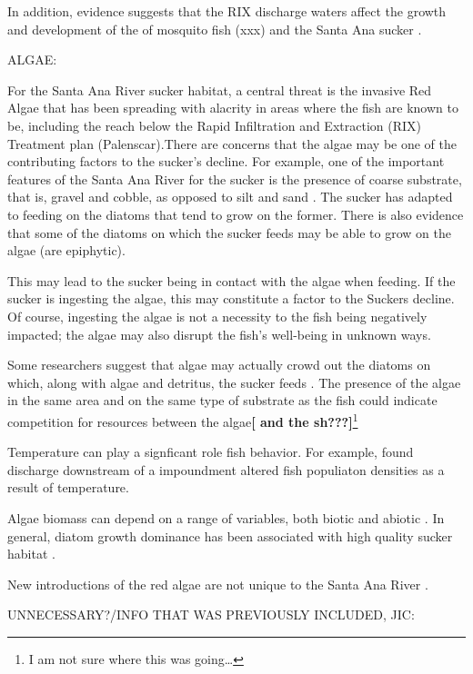 \documentclass{article}\usepackage[]{graphicx}\usepackage[]{color}
\begin{document}
In addition, evidence suggests that the RIX discharge waters affect the growth and development of the of mosquito fish (xxx) and the Santa Ana sucker \citep{jenkins2009effects}.

ALGAE: 

For the Santa Ana River sucker habitat, a central threat is the invasive Red Algae that has been spreading with alacrity in areas where the fish are known to be, including the reach below the Rapid Infiltration and Extraction (RIX) Treatment plan (Palenscar).There are concerns that the algae may be one of the contributing factors to the sucker's decline. For example, one of the important features of the Santa Ana River for the sucker is the presence of coarse substrate, that is, gravel and cobble, as opposed to silt and sand \citep{thompson2010influence}. The sucker has adapted to feeding on the diatoms that tend to grow on the former. There is also evidence that some of the diatoms on which the sucker feeds may be able to grow on the algae (are epiphytic). 

This may lead to the sucker being in contact with the algae when feeding. If the sucker is ingesting the algae, this may constitute a factor to the Suckers decline. Of course, ingesting the algae is not a necessity to the fish being negatively impacted; the algae may also disrupt the fish's well-being in unknown ways. 

Some researchers suggest that algae may actually crowd out the diatoms on which, along with algae and detritus, the sucker feeds \citep{thompson2010influence}. The presence of the algae in the same area and on the same type of substrate as the fish could indicate competition for resources between the algae\textbf{[ and the sh???]}\footnote{I am not sure where this was going\ldots}



Temperature can play a signficant role fish behavior. For example, \citet{sadler1980effect} found discharge downstream of a impoundment altered fish populiaton densities as a result of temperature.

Algae biomass can depend on a range of variables, both biotic and abiotic \citep{winkelmann2014top}. In general, diatom growth dominance has been associated with high quality sucker habitat \citep{REF}. 

New introductions of the red algae are not unique to the Santa Ana River \citep{vzakova2013new}.

UNNECESSARY?/INFO THAT WAS PREVIOUSLY INCLUDED, JIC:
\end{document}
